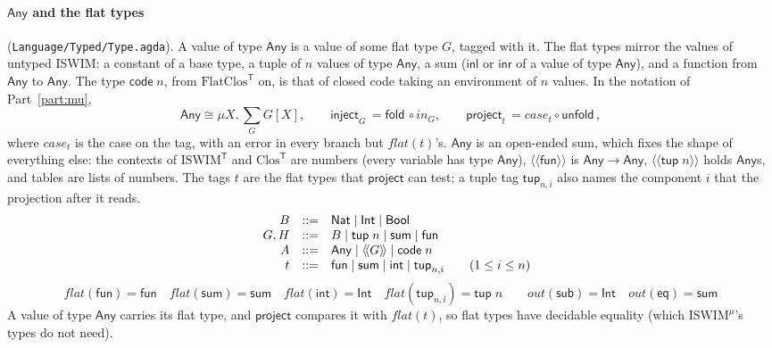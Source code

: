 \documentclass[10pt]{article}
\makeatletter
\theoremstyle{acmplain}
\newcommand{\key}[1]{\mathsf{#1}}
\newcommand{\Tl}[1]{\textrm{#1}^{\mathsf{T}}}  %
\newcommand{\TAny}{\key{Any}}
\newcommand{\Tflat}[1]{\langle\!\langle #1 \rangle\!\rangle}  %
\newcommand{\Tcode}[1]{\key{code}\;#1}         %
\newcommand{\Tfun}{\key{fun}}                  %
\newcommand{\Tsum}{\key{sum}}                  %
\newcommand{\Ttup}[1]{\key{tup}\;#1}           %
\newcommand{\Tint}{\key{int}}                  %
\newcommand{\Tttup}[2]{\key{tup}_{#1,#2}}      %
\newcommand{\Tflatof}[1]{\mathit{flat}(#1)}    %
\newcommand{\Tout}[1]{\mathit{out}(#1)}        %
\newcommand{\Tinject}[1]{\key{inject}_{#1}\,}
\newcommand{\Tproject}[1]{\key{project}_{#1}\,}
\newcommand{\Ml}[1]{\textrm{#1}^{\mu}}                  %
\newcommand{\Mfold}{\key{fold}\,}
\newcommand{\Munfold}{\key{unfold}\,}
\newenvironment{syntax}{\[\begin{array}{l@{\quad}rcl}}{\end{array}\]}
\makeatother
\begin{document}
\paragraph{$\TAny$ and the flat types} (\texttt{Language/Typed/Type.agda}). A
value of type $\TAny$ is a value of some flat type $G$, tagged with it.
The flat types mirror the values of untyped ISWIM: a constant of a base
type, a tuple of $n$ values of type $\TAny$, a sum ($\key{inl}$ or
$\key{inr}$ of a value of type $\TAny$), and a function from $\TAny$ to
$\TAny$. The type $\Tcode{n}$, from $\Tl{FlatClos}$ on, is that of closed code
taking an environment of $n$ values. In the notation of
Part~\ref{part:mu},
\[
  \TAny \cong \mu X.\, \textstyle\sum_{G} G[X], \qquad
  \Tinject{G} = \Mfold \circ \mathit{in}_G, \qquad
  \Tproject{t} = \mathit{case}_t \circ \Munfold ,
\]
where $\mathit{case}_t$ is the case on the tag, with an error in every
branch but $\Tflatof{t}$'s. $\TAny$ is an open-ended sum, which fixes the shape of everything else: the contexts
of $\Tl{ISWIM}$ and $\Tl{Clos}$ are numbers (every variable has type
$\TAny$), $\Tflat{\Tfun}$ is $\TAny \to \TAny$, $\Tflat{\Ttup{n}}$ holds
$\TAny$s, and tables are lists of numbers. The tags $t$ are the flat types
that $\key{project}$ can test; a tuple tag $\Tttup{n}{i}$ also names the
component $i$ that the projection after it reads.
\begin{syntax}
  & B &::=& \key{Nat} \mid \key{Int} \mid \key{Bool} \\
  & G, H &::=& B \mid \Ttup{n} \mid \Tsum \mid \Tfun \\
  & A &::=& \TAny \mid \Tflat{G} \mid \Tcode{n} \\
  & t &::=& \Tfun \mid \Tsum \mid \Tint \mid \Tttup{n}{i}
    \qquad (1 \leq i \leq n)
\end{syntax}
\[
  \Tflatof{\Tfun} = \Tfun \quad
  \Tflatof{\Tsum} = \Tsum \quad
  \Tflatof{\Tint} = \key{Int} \quad
  \Tflatof{\Tttup{n}{i}} = \Ttup{n}
  \qquad
  \Tout{\key{sub}} = \key{Int} \quad
  \Tout{\key{eq}} = \Tsum
\]
A value of type $\TAny$ carries its flat type, and $\key{project}$ compares
it with $\Tflatof{t}$, so flat types have decidable equality (which
$\Ml{ISWIM}$'s types do not need).
\end{document}
